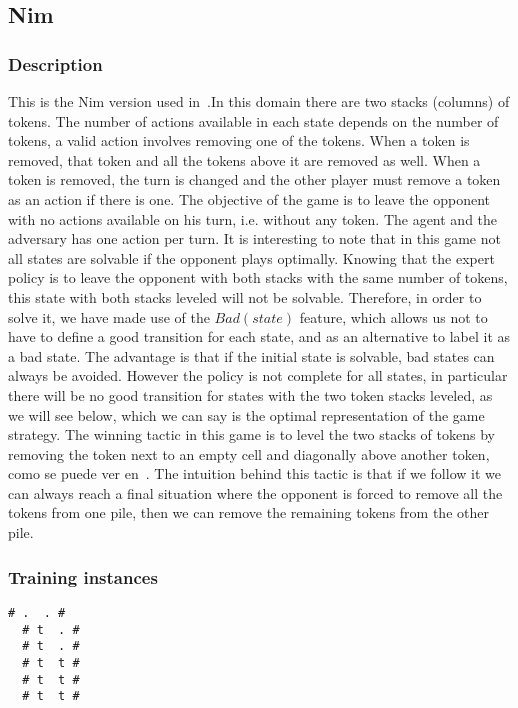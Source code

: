 \documentclass[a4paper]{article}
\begin{document}
\subsection{Nim}
\subsubsection{Description}
This is the Nim version used in~\cite{silver2020few}.In this domain there are two stacks (columns) of tokens. The number of actions available in each state depends on the number of tokens, a valid action involves removing one of the tokens. When a token is removed, that token and all the tokens above it are removed as well. When a token is removed, the turn is changed and the other player must remove a token as an action if there is one. The objective of the game is to leave the opponent with no actions available on his turn, i.e. without any token. The agent and the adversary has one action per turn.
It is interesting to note that in this game not all states are solvable if the opponent plays optimally. Knowing that the expert policy is to leave the opponent with both stacks with the same number of tokens, this state with both stacks leveled will not be solvable. Therefore, in order to solve it, we have made use of the $Bad(state)$ feature, which allows us not to have to define a good transition for each state, and as an alternative to label it as a bad state. The advantage is that if the initial state is solvable, bad states can always be avoided. However the policy is not complete for all states, in particular there will be no good transition for states with the two token stacks leveled, as we will see below, which we can say is the optimal representation of the game strategy. The winning tactic in this game is to level the two stacks of tokens by removing the token next to an empty cell and diagonally above another token, como se puede ver en~\cite{silver2020few}. The intuition behind this tactic is that if we follow it we can always reach a final situation where the opponent is forced to remove all the tokens from one pile, then we can remove the remaining tokens from the other pile.


\subsubsection{Training instances}
\begin{Verbatim}[fontsize=\footnotesize]
  # .  . #
  # t  . #
  # t  . #
  # t  t #
  # t  t #
  # t  t #
\end{Verbatim}
\end{document}
